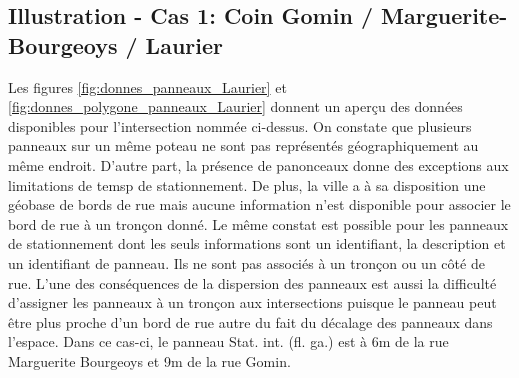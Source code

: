     \subsection{Illustration - Cas 1: Coin Gomin / Marguerite-Bourgeoys / Laurier}
      Les figures \ref{fig:donnes_panneaux_Laurier} et \ref{fig:donnes_polygone_panneaux_Laurier} donnent un aperçu des données disponibles pour l'intersection nommée ci-dessus. On constate que plusieurs panneaux sur un même poteau ne sont pas représentés géographiquement au même endroit. D'autre part, la présence de panonceaux donne des exceptions aux limitations de temsp de stationnement. De plus, la ville a à sa disposition une géobase de bords de rue mais aucune information n'est disponible pour associer le bord de rue à un tronçon donné. Le même constat est possible pour les panneaux de stationnement dont les seuls informations sont un identifiant, la description et un identifiant de panneau. Ils ne sont pas associés à un tronçon ou un côté de rue. L'une des conséquences de la dispersion des panneaux est aussi la difficulté d'assigner les panneaux à un tronçon aux intersections puisque le panneau peut être plus proche d'un bord de rue autre du fait du décalage des panneaux dans l'espace. Dans ce cas-ci, le panneau Stat. int. (fl. ga.) est à 6m de la rue Marguerite Bourgeoys et 9m de la rue Gomin.
